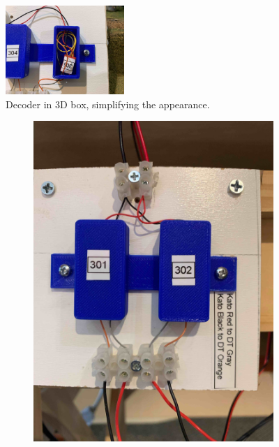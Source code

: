 	\begin{figure}[htbp]
	\centering
	\includegraphics[width=0.4\textwidth]{./figures/printer/DecoderInBox.jpg}
	\caption{Decoder in 3D box, simplifying the appearance.}
		\label{fig:decoderInBox}
	\end{figure}
	
    \begin{figure}[htpb]
        \centering
        \begin{subfigure}[b]{0.475\textwidth}
            \centering
            \includegraphics[width=\textwidth]{./figures/printer/TwoBoxes.jpg}

\end{subfigure}
\end{figure}
